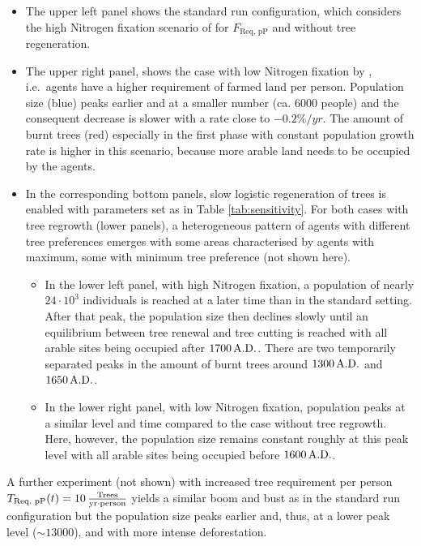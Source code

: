 \begin{itemize}
	\item The upper left panel shows the standard run configuration, which considers the high Nitrogen fixation scenario of \citet{Puleston2017} for $F_\text{Req, pP}$ and without tree regeneration.
	\item The upper right panel, shows the case with low Nitrogen fixation by \citet{Puleston2017}, i.e.\ agents have a higher requirement of farmed land per person.
	Population size (blue) peaks earlier and at a smaller number (ca. $6000$ people) and the consequent decrease is slower with a rate close to $-0.2\%/yr$.
	The amount of burnt trees (red) especially in the first phase with constant population growth rate is higher in this scenario, because more arable land needs to be occupied by the agents.
	\item In the corresponding bottom panels, slow logistic regeneration of trees is enabled with parameters set as in Table \ref{tab:sensitivity}. 
	For both cases with tree regrowth (lower panels), a heterogeneous pattern of agents with different tree preferences emerges with some areas characterised by agents with maximum, some with minimum tree preference (not shown here).
	\begin{itemize}
		\item In the lower left panel, with high Nitrogen fixation, a population of nearly $24\cdot10^3$ individuals is reached at a later time than in the standard setting. After that peak, the population size then declines slowly until an equilibrium between tree renewal and tree cutting is reached with all arable sites being occupied after $1700\, {\rm A.D.}$.
		There are two temporarily separated peaks in the amount of burnt trees around $1300\, {\rm A.D.}$ and $1650\, {\rm A.D.}$.
		\item In the lower right panel, with low Nitrogen fixation, population peaks at a similar level and time compared to the case without tree regrowth.
		Here, however, the population size remains constant roughly at this peak level with all arable sites being occupied before $1600\, {\rm A.D.}$.
	\end{itemize}

\end{itemize}
A further experiment (not shown) with increased tree requirement per person $T_\text{Req, pP}(t)=10\,{\rm \frac{Trees}{yr\cdot person}}$ yields a similar boom and bust as in the standard run configuration but the population size peaks earlier and, thus, at a lower peak level ($\sim 13000$), and with more intense deforestation.
 
